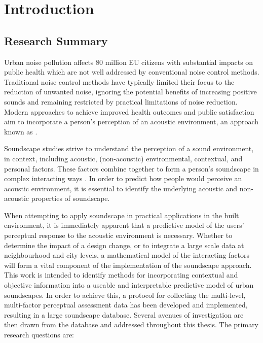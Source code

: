 \chapter{Introduction}
\label{ch:intro}

\section{Research Summary}
Urban noise pollution affects 80 million EU citizens with substantial impacts on public health which are not well addressed by conventional noise control methods. Traditional noise control methods have typically limited their focus to the reduction of unwanted noise, ignoring the potential benefits of increasing positive sounds and remaining restricted by practical limitations of noise reduction. Modern approaches to achieve improved health outcomes and public satisfaction aim to incorporate a person's perception of an acoustic environment, an approach known as .

Soundscape studies strive to understand the perception of a sound environment, in context, including acoustic, (non-acoustic) environmental, contextual, and personal factors. These factors combine together to form a person's soundscape in complex interacting ways \citep{Berglund2006Tool}. In order to predict how people would perceive an acoustic environment, it is essential to identify the underlying acoustic and non-acoustic properties of soundscape.

When attempting to apply soundscape in practical applications in the built environment, it is immediately apparent that a predictive model of the users' perceptual response to the acoustic environment is necessary. Whether to determine the impact of a design change, or to integrate a large scale data at neighbourhood and city levels, a mathematical model of the interacting factors will form a vital component of the implementation of the soundscape approach. This work is intended to identify methods for incorporating contextual and objective information into a useable and interpretable predictive model of urban soundscapes. In order to achieve this, a protocol for collecting the multi-level, multi-factor perceptual assessment data has been developed and implemented, resulting in a large soundscape database. Several avenues of investigation are then drawn from the database and addressed throughout this thesis. The primary research questions are:

